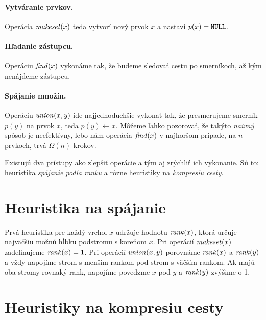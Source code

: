 \paragraph{Vytváranie prvkov.}%
Operácia $\mathop{\mathit{makeset}}(x)$ teda vytvorí nový prvok $x$ a nastaví $p(x) = \texttt{NULL}$. 

\paragraph{Hľadanie zástupcu.}%
Operáciu $\mathop{\mathit{find}}(x)$ vykonáme tak, že budeme sledovať cestu po smerníkoch, až 
kým nenájdeme zástupcu. 

\paragraph{Spájanie množín.}%
Operáciu $\mathop{\mathit{union}}(x, y)$ ide najjednoduchšie vykonať tak, že presmerujeme smerník 
$p(y)$ na prvok $x$, teda $p(y) \gets x$. 
Môžeme ľahko pozorovať, že takýto \emph{naivný} spôsob je neefektívny, 
lebo nám operácia $\mathop{\mathit{find}}(x)$ v najhoršom prípade, na $n$ prvkoch, trvá $\Omega(n)$ 
krokov. 

\bigskip
Existujú dva prístupy ako zlepšiť operácie a tým aj zrýchliť ich vykonanie. 
Sú to: heuristika \emph{spájanie podľa ranku} a rôzne heuristiky na 
\emph{kompresiu cesty}. 

\section{Heuristika na spájanie}\label{sec:komp-union}

Prvá heuristika pre každý vrchol $x$ udržuje hodnotu $\mathop{\mathit{rank}}(x)$,
ktorá určuje najväčšiu možnú hĺbku podstromu s koreňom $x$.
Pri o\-pe\-rá\-cií $\mathop{\mathit{makeset}}(x)$ zadefinujeme $\mathop{\mathit{rank}}(x) = 1$. 
Pri o\-pe\-rá\-cií $\mathop{\mathit{union}}(x, y)$ porovnáme $\mathop{\mathit{rank}}(x)$ a $\mathop{\mathit{rank}}(y)$
a vždy napojíme strom s menším rankom pod strom s väčším rankom.
Ak majú oba stromy rovnaký rank, napojíme povedzme $x$ pod $y$
a $\mathop{\mathit{rank}}(y)$ zvýšime o 1.

\section{Heuristiky na kompresiu cesty}\label{sec:komp-cesta}
      
